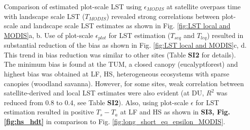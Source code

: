 \documentclass[fleqn,10pt]{wlscirep}
\begin{document}
Comparison of estimated plot-scale LST using $\epsilon_{MODIS}$ at satellite overpass time with landscape scale LST ($T_{MODIS}$) revealed strong correlations between plot-scale and landscape scale LST estimates as shown in Fig. \ref{fig:LST local and MODIS}a, b. Use  of plot-scale $\epsilon_{plot}$ for LST estimation ($T_{seq}$ and $T_{leq}$) resulted in substantial reduction of the bias as shown in Fig. \ref{fig:LST local and MODIS}c, d. This trend in bias reduction was similar to other sites (Table \textbf{SI2} for details). The  minimum bias is found  at the TUM, a closed canopy (eucalyptforest) and highest bias was obtained at LF, HS, heterogeneous ecosystems with sparse canopies (woodland savanna). However, for some sites, weak correlation between satellite-derived and local LST estimates were also evident (at DU, $R^2$ was reduced from 0.8 to 0.4, see Table \textbf{SI2}). Also, using plot-scale $\epsilon$ for LST estimation resulted in positive $T_{s} - T_{a}$ at LF and HS as shown in \textbf{SI3, Fig. \ref{fig:hs_hdt}} in comparison to Fig. \ref{fig:long_short_eq_epsilon_MODIS}.  
\end{document}
